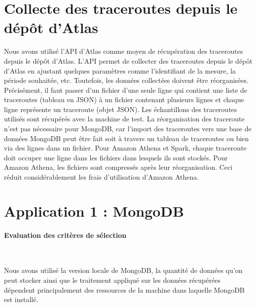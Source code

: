\section{Collecte des traceroutes depuis le dépôt d'Atlas }
Nous avons utilisé l'API d'Atlas  comme moyen de  récupération des traceroutes depuis le dépôt d'Atlas. L'API permet de collecter des traceroutes depuis le dépôt d'Atlas en ajustant quelques paramètres comme  l'identifiant de la mesure, la période souhaitée, etc. Toutefois, les données collectées doivent être réorganisées. Précisément, il faut passer d'un fichier d'une seule ligne qui contient une liste de traceroutes (tableau en JSON) à un fichier contenant plusieurs lignes et chaque ligne représente un traceroute (objet JSON). Les échantillons des traceroutes utilisés sont récupérés  avec la machine de test. 
La réorganisation des traceroute n'est pas nécessaire  pour MongoDB, car l'import des traceroutes vers une base de données MongoDB peut être fait soit  à travers un tableau  de traceroutes ou bien via des lignes dans un fichier. Pour Amazon Athena et Spark, chaque traceroute doit occuper une  ligne dans les fichiers dans lesquels ils sont stockés. Pour Amazon Athena, les fichiers  sont compressés après leur réorganisation. Ceci  réduit considérablement les frais d'utilisation d'Amazon Athena.


\section{Application 1 : MongoDB} \label{mongodb-impleme}


\paragraph{Evaluation des critères de sélection}~

Nous avons utilisé la version locale de MongoDB, la quantité de données qu'on peut stocker ainsi que le traitement appliqué sur les données récupérées dépendent principalement des ressources de la machine dans laquelle MongoDB est installé.
 
